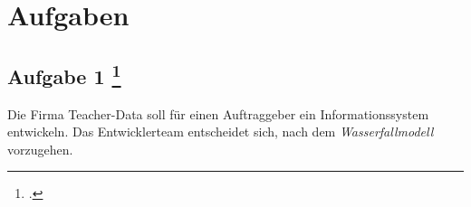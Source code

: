 \documentclass{lehramt-informatik-haupt}
\begin{document}

\chapter{Aufgaben}

%

\section{Aufgabe 1
\footcite[Seite 1]{sosy:ab:1}}

Die Firma Teacher-Data soll für einen Auftraggeber ein
Informationssystem entwickeln. Das Entwicklerteam entscheidet sich, nach
dem \emph{Wasserfallmodell} vorzugehen.
\end{document}
